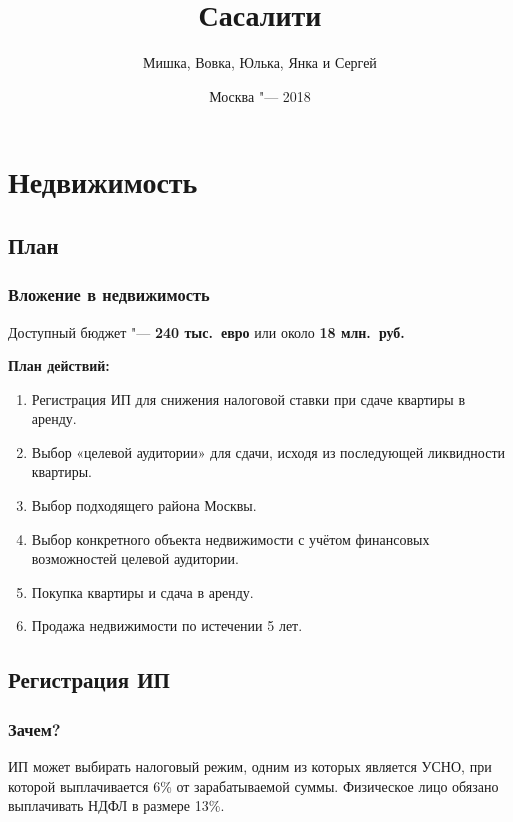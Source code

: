 \documentclass{beamer}
\title{{Сасалити}}
\author{Мишка, Вовка, Юлька, Янка и Сергей\\}
\date{\footnotesize{Москва "--- 2018}}
\begin{document}
\section{Недвижимость}

	\subsection{План}
	
		\begin{frame}
			\frametitle{Вложение в недвижимость}
			
			Доступный бюджет "--- \textbf{240 тыс.\ евро} или около \textbf{18 млн.\ руб.}
			
			\vspace{\baselineskip}
			\textbf{План действий:}
			\begin{enumerate}
			\item Регистрация ИП для снижения налоговой ставки при сдаче квартиры в аренду.
			\item Выбор «целевой аудитории» для сдачи, исходя из последующей ликвидности квартиры.
			\item Выбор подходящего района Москвы.
			\item Выбор конкретного объекта недвижимости с учётом финансовых возможностей целевой аудитории.
			\item Покупка квартиры и сдача в аренду.
			\item Продажа недвижимости по истечении 5 лет.
			\end{enumerate}
		
		\end{frame}

	\subsection{Регистрация ИП}
	
		\begin{frame}
			\frametitle{Зачем?}
		
			ИП может выбирать налоговый режим, одним из которых является УСНО, при которой выплачивается 6\% от зарабатываемой суммы.
			Физическое лицо обязано выплачивать НДФЛ в размере 13\%.
		
		\end{frame}
\end{document}
